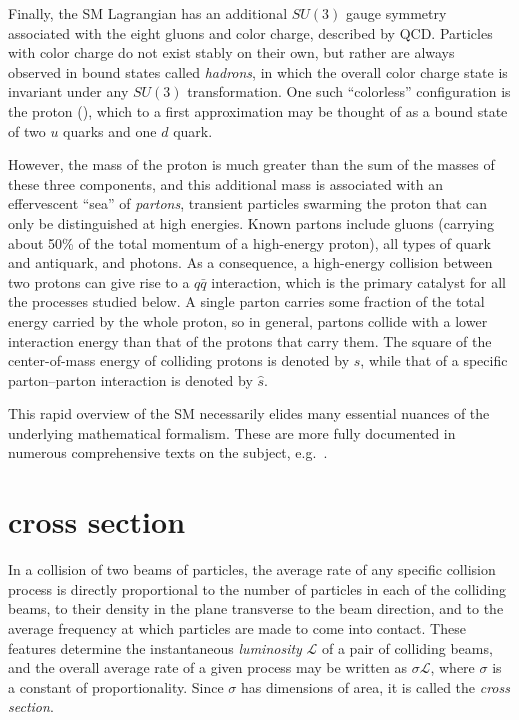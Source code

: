 Finally, the SM Lagrangian has an additional $SU(3)$ gauge symmetry associated with the eight gluons and color charge, described by QCD.
Particles with color charge do not exist stably on their own, but rather are always observed in bound states called \textit{hadrons}, in which the overall color
charge state is invariant under any $SU(3)$ transformation. One such ``colorless'' configuration is the proton (\Pp), which
to a first approximation may be thought of as a bound state of two $u$ quarks and one $d$ quark.

However, the mass of the proton is much greater than the sum of the masses of these three components, and this additional mass is associated with an effervescent
``sea'' of \textit{partons}, transient particles swarming the proton that can only be distinguished at high energies.
Known partons include gluons (carrying about 50\% of the total momentum of a high-energy proton),
all types of quark and antiquark, and photons. As a consequence, a high-energy collision between two protons can give rise to a $q\bar{q}$ interaction,
which is the primary catalyst for all the processes studied below. A single parton carries some fraction of the total energy carried by the whole proton,
so in general, partons collide with a lower interaction energy than that of the protons that carry them.
The square of the center-of-mass energy of colliding protons is denoted by $s$, while that of a specific
parton--parton interaction is denoted by $\hat{s}$.

This rapid overview of the SM necessarily elides many essential nuances of the underlying mathematical formalism. These are more fully
documented in numerous comprehensive texts on the subject, e.g.~\cite{ref:HalzenMartin, ref:BargerPhillips, ref:PeskinSchroeder, ref:Srednicki, ref:Schwartz}.

\section{\texorpdfstring{\zinvg}{Z(νν)γ} cross section} \label{sec:introduction_znng}
In a collision of two beams of particles, the average rate of any specific collision process is directly proportional to the
number of particles in each of the colliding beams, to their density in the plane transverse to the beam direction, and to the average
frequency at which particles are made to come into contact. These features determine the instantaneous \textit{luminosity} $\mathcal{L}$ of a pair
of colliding beams, and the overall average rate of a given process may be written as $\sigma \mathcal{L}$, where $\sigma$
is a constant of proportionality. Since $\sigma$ has dimensions of area, it is called the \textit{cross section}.

